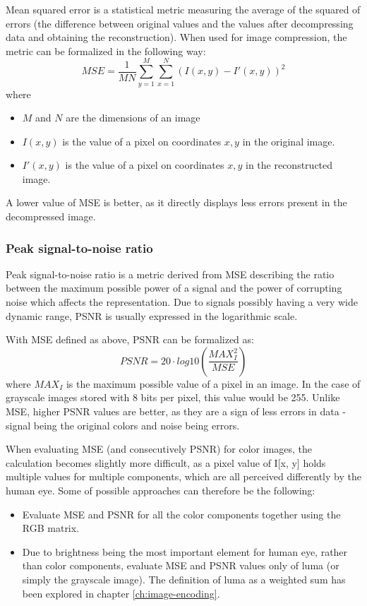\documentclass[thesis=M,english]{FITthesis}[2012/10/20]
\begin{document}
Mean squared error is a statistical metric measuring the average
of the squared of errors (the difference between original values and
the values after decompressing data and obtaining the reconstruction).
When used for image compression, the metric can be formalized in the
following way:
\begin{equation}
    MSE = \frac{1}{MN}\sum_{y=1}^{M}\sum_{x=1}^{N}(I(x,y) - I'(x,y))^2
\end{equation}
where
\begin{itemize}
    \item $M$ and $N$ are the dimensions of an image
    \item $I(x, y)$ is the value of a pixel on coordinates $x, y$ in the
    original image.
    \item $I'(x, y)$ is the value of a pixel on coordinates $x, y$ in the
    reconstructed image.
\end{itemize}
A lower value of MSE is better, as it directly displays less errors present
in the decompressed image.

\subsubsection{Peak signal-to-noise ratio}
Peak signal-to-noise ratio is a metric derived from MSE describing the ratio
between the maximum possible power of a signal and the power of corrupting
noise which affects the representation. Due to signals possibly having
a very wide dynamic range, PSNR is usually expressed in the logarithmic scale.

With MSE defined as above, PSNR can be formalized as:
\begin{equation}
    PSNR = 20 \cdot log10 \left( \frac{MAX^2_I}{MSE} \right)
\end{equation}
where $MAX_I$ is the maximum possible value of a pixel in an image. In the
case of grayscale images stored with 8 bits per pixel, this value would
be 255. Unlike MSE, higher PSNR values are better, as they are a sign of less errors
in data - signal being the original colors and noise being errors.

When evaluating MSE (and consecutively PSNR) for color images, the calculation becomes
slightly more difficult, as a pixel value of I[x, y] holds multiple values for multiple
components, which are all perceived differently by the human eye. Some of possible approaches
can therefore be the following:
\begin{itemize}
  \item Evaluate MSE and PSNR for all the color components together using the RGB matrix.
  \item Due to brightness being the most important element for human eye, rather than
  color components, evaluate MSE and PSNR values only of luma (or simply the grayscale
  image). The definition of luma as a weighted sum has been explored in chapter \ref{ch:image-encoding}.
\end{itemize}
\cite{matlab18}\cite{netpbm}
\end{document}
